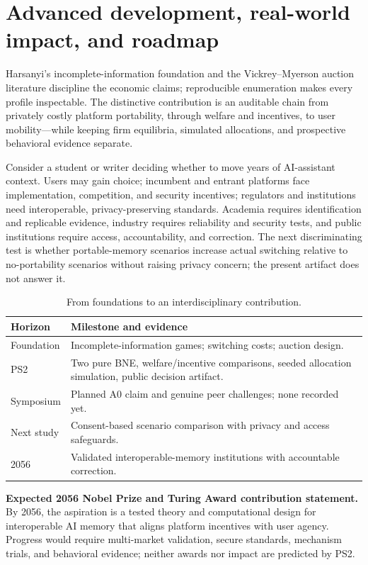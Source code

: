 \section{Advanced development, real-world impact, and roadmap}
Harsanyi's incomplete-information foundation and the Vickrey--Myerson auction literature discipline the economic claims; reproducible enumeration makes every profile inspectable. The distinctive contribution is an auditable chain from privately costly platform portability, through welfare and incentives, to user mobility---while keeping firm equilibria, simulated allocations, and prospective behavioral evidence separate.

Consider a student or writer deciding whether to move years of AI-assistant context. Users may gain choice; incumbent and entrant platforms face implementation, competition, and security incentives; regulators and institutions need interoperable, privacy-preserving standards. Academia requires identification and replicable evidence, industry requires reliability and security tests, and public institutions require access, accountability, and correction. The next discriminating test is whether portable-memory scenarios increase actual switching relative to no-portability scenarios without raising privacy concern; the present artifact does not answer it.

\begin{table}[h]\caption{From foundations to an interdisciplinary contribution.}\small
\begin{tabularx}{\columnwidth}{@{}p{1.35cm}Y@{}}\toprule
\textbf{Horizon}&\textbf{Milestone and evidence}\\\midrule
Foundation&Incomplete-information games; switching costs; auction design.\\
PS2&Two pure BNE, welfare/incentive comparisons, seeded allocation simulation, public decision artifact.\\
Symposium&Planned A0 claim and genuine peer challenges; none recorded yet.\\
Next study&Consent-based scenario comparison with privacy and access safeguards.\\
2056&Validated interoperable-memory institutions with accountable correction.\\\bottomrule
\end{tabularx}\end{table}

\noindent\textbf{Expected 2056 Nobel Prize and Turing Award contribution statement.}
By 2056, the aspiration is a tested theory and computational design for interoperable AI memory that aligns platform incentives with user agency. Progress would require multi-market validation, secure standards, mechanism trials, and behavioral evidence; neither awards nor impact are predicted by PS2.

